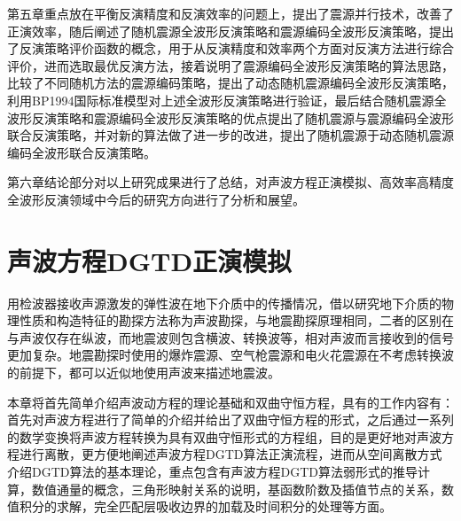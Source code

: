 \documentclass[12pt]{article}
\begin{document}
\par
第五章重点放在平衡反演精度和反演效率的问题上，提出了震源并行技术，改善了正演效率，随后阐述了随机震源全波形反演策略和震源编码全波形反演策略，提出了反演策略评价函数的概念，用于从反演精度和效率两个方面对反演方法进行综合评价，进而选取最优反演方法，接着说明了震源编码全波形反演策略的算法思路，比较了不同随机方法的震源编码策略，提出了动态随机震源编码全波形反演策略，利用BP1994国际标准模型对上述全波形反演策略进行验证，最后结合随机震源全波形反演策略和震源编码全波形反演策略的优点提出了随机震源与震源编码全波形联合反演策略，并对新的算法做了进一步的改进，提出了随机震源于动态随机震源编码全波形联合反演策略。
\setcounter{figure}{0}
\setcounter{table}{0}
\par
第六章结论部分对以上研究成果进行了总结，对声波方程正演模拟、高效率高精度全波形反演领域中今后的研究方向进行了分析和展望。
\newpage
\section{声波方程DGTD正演模拟}
用检波器接收声源激发的弹性波在地下介质中的传播情况，借以研究地下介质的物理性质和构造特征的勘探方法称为声波勘探，与地震勘探原理相同，二者的区别在与声波仅存在纵波，而地震波则包含横波、转换波等，相对声波而言接收到的信号更加复杂。地震勘探时使用的爆炸震源、空气枪震源和电火花震源在不考虑转换波的前提下，都可以近似地使用声波来描述地震波。
\par
本章将首先简单介绍声波动方程的理论基础和双曲守恒方程，具有的工作内容有：首先对声波方程进行了简单的介绍并给出了双曲守恒方程的形式，之后通过一系列的数学变换将声波方程转换为具有双曲守恒形式的方程组，目的是更好地对声波方程进行离散，更方便地阐述声波方程DGTD算法正演流程，进而从空间离散方式介绍DGTD算法的基本理论，重点包含有声波方程DGTD算法弱形式的推导计算，数值通量的概念，三角形映射关系的说明，基函数阶数及插值节点的关系，数值积分的求解，完全匹配层吸收边界的加载及时间积分的处理等方面。
\end{document}
